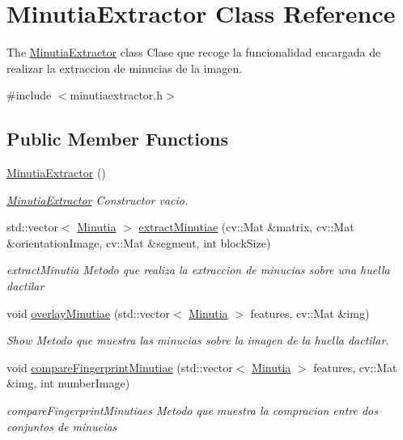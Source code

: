 \hypertarget{class_minutia_extractor}{\section{Minutia\+Extractor Class Reference}
\label{class_minutia_extractor}
}


The \hyperlink{class_minutia_extractor}{Minutia\+Extractor} class Clase que recoge la funcionalidad encargada de realizar la extraccion de minucias de la imagen.  




{\ttfamily \#include $<$minutiaextractor.\+h$>$}

\subsection*{Public Member Functions}
\begin{DoxyCompactItemize}
\item 
\hypertarget{class_minutia_extractor_adccd8fca1f1718e7b736f158700d432a}{\hyperlink{class_minutia_extractor_adccd8fca1f1718e7b736f158700d432a}{Minutia\+Extractor} ()}\label{class_minutia_extractor_adccd8fca1f1718e7b736f158700d432a}

\begin{DoxyCompactList}\small\item\em \hyperlink{class_minutia_extractor}{Minutia\+Extractor} Constructor vacio. \end{DoxyCompactList}\item 
std\+::vector$<$ \hyperlink{class_minutia}{Minutia} $>$ \hyperlink{class_minutia_extractor_adbde01c42359f1cddc3d8cb99f09f5d9}{extract\+Minutiae} (cv\+::\+Mat \&matrix, cv\+::\+Mat \&orientation\+Image, cv\+::\+Mat \&segment, int block\+Size)
\begin{DoxyCompactList}\small\item\em extract\+Minutia Metodo que realiza la extraccion de minucias sobre una huella dactilar \end{DoxyCompactList}\item 
void \hyperlink{class_minutia_extractor_aa71d473dd4dcf6559a47765d17e16d5f}{overlay\+Minutiae} (std\+::vector$<$ \hyperlink{class_minutia}{Minutia} $>$ features, cv\+::\+Mat \&img)
\begin{DoxyCompactList}\small\item\em Show Metodo que muestra las minucias sobre la imagen de la huella dactilar. \end{DoxyCompactList}\item 
void \hyperlink{class_minutia_extractor_a7010ac95bbbfa607897eef04acc5e9aa}{compare\+Fingerprint\+Minutiae} (std\+::vector$<$ \hyperlink{class_minutia}{Minutia} $>$ features, cv\+::\+Mat \&img, int number\+Image)
\begin{DoxyCompactList}\small\item\em compare\+Fingerprint\+Minutiaes Metodo que muestra la compracion entre dos conjuntos de minucias \end{DoxyCompactList}\end{DoxyCompactItemize}
